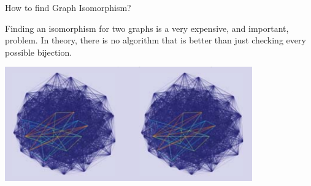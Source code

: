\begin{frame}{How to find Graph Isomorphism?}

  Finding an isomorphism for two graphs is a very expensive, and important, problem. In theory, there is no algorithm that is better than just checking every possible bijection.

  \begin{center}
    \includegraphics[width=0.8\textwidth]{../img/isomorphism}
  \end{center}
\end{frame}
